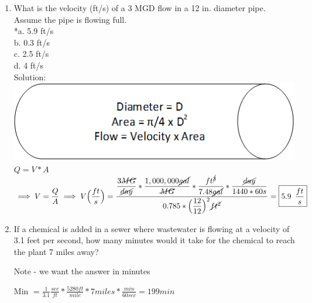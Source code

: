 \documentclass{article}
\begin{document}
\begin{enumerate}
\vspace{1cm}

\item What is the velocity (ft/s) of a 3 MGD flow in a 12 in. diameter pipe. Assume the pipe is flowing full.\\

*a. 5.9 ft/s \\
b. 0.3 ft/s \\
c. 2.5 ft/s \\
d. 4 ft/s \\
\vspace{0.5cm}
Solution:\\
\vspace{0.3cm}
\includegraphics[scale=0.5]{PipeFlow}\\
$Q=V*A$\\
$\implies V=\dfrac{Q}{A} \implies V \Big(\dfrac{ft}{s}\Big)= \dfrac{\dfrac{3\cancel{MG}}{\cancel{day}}*\dfrac{1,000,000\cancel{gal}}{\cancel{MG}}*\dfrac{ft^{\cancel{3}}}{7.48\cancel{gal}}*\dfrac{\cancel{day}}{1440*60s}}{0.785*\Big(\dfrac{12}{12}\Big)^2\cancel{ft^2}}=\boxed{5.9 \enspace\dfrac{ft}{s}}$


\item If a chemical is added in a sewer where wastewater is flowing at a velocity of 3.1 feet per second, how many minutes would it take for the chemical to reach the plant 7 miles away?  

Note - we want the answer in minutes

Min $= \frac{1}{3.1}\frac{sec}{ft}*\frac{5280ft}{mile}*7 miles*\frac{min}{60 sec} = \boxed{199 min}$



\end{enumerate}
\end{document}
